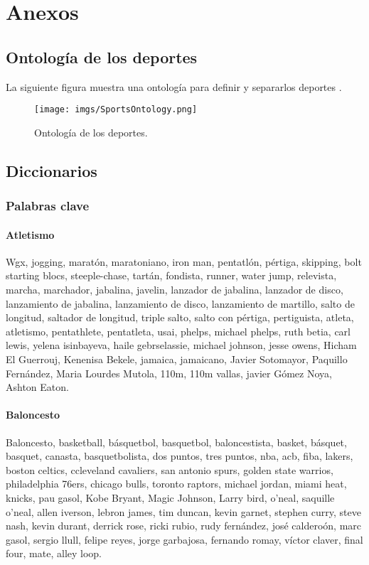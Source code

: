 \documentclass[../all.tex]{subfiles}
\begin{document}
\section{Anexos} 


	\subsection{Ontología de los deportes}
		La siguiente figura muestra una ontología para definir y separarlos deportes \cite{Ontologia}.
		\begin{figure}[H]
			\centering
			\texttt{[image: imgs/SportsOntology.png]}
			\caption{Ontología de los deportes.}
		\end{figure}

	\newpage
\subsection{Diccionarios}
\subsubsection{Palabras clave}
    \paragraph{Atletismo}
    Wgx, jogging, maratón, maratoniano, iron man, pentatlón, pértiga, skipping, bolt starting blocs, steeple-chase, tartán, fondista, runner, water jump, relevista, marcha, marchador, jabalina, javelin, lanzador de jabalina, lanzador de disco, lanzamiento de jabalina, lanzamiento de disco, lanzamiento de martillo, salto de longitud,
    saltador de longitud, triple salto, salto con pértiga, pertiguista, atleta, atletismo, pentathlete, pentatleta, usai, phelps, michael phelps, ruth betia, carl lewis, yelena isinbayeva, haile gebrselassie, michael johnson, jesse owens, Hicham El Guerrouj, Kenenisa Bekele, jamaica, jamaicano, Javier Sotomayor, Paquillo Fernández, Maria Lourdes Mutola, 110m, 110m vallas, javier Gómez Noya, Ashton Eaton.
    \paragraph{Baloncesto}
    Baloncesto, basketball, básquetbol, basquetbol, baloncestista, basket, básquet, basquet, canasta, basquetbolista, dos puntos, tres puntos, nba, acb, fiba, lakers, boston celtics, ccleveland cavaliers, san antonio spurs, golden state warrios, philadelphia 76ers, chicago bulls, toronto raptors, michael jordan, miami heat, knicks, pau gasol, Kobe Bryant,  Magic Johnson,  Larry bird,  o'neal, saquille o'neal, allen iverson, lebron james, tim duncan, kevin garnet, stephen curry, steve nash, kevin durant, derrick rose, ricki rubio, rudy fernández, josé calderoón, marc gasol, sergio llull, felipe reyes, jorge garbajosa, fernando romay, víctor claver, final four, mate, alley loop.
\end{document}
